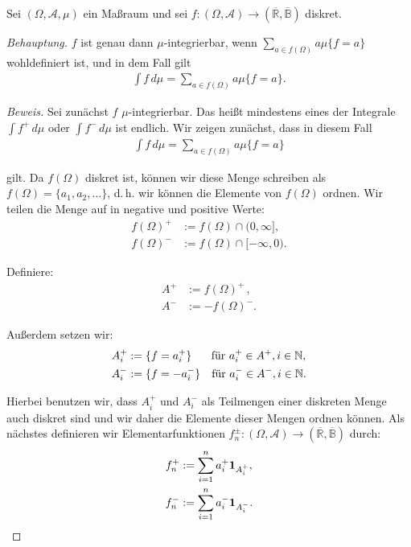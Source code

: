 \documentclass[10pt]{article}
\newcommand{\R}{\mathbb{R}}
\newcommand{\N}{\mathbb{N}}
\newcommand{\beh}{\textit{Behauptung. }}
\newenvironment{Aufgabe}[2][Aufgabe]{\begin{trivlist}
\item[\hskip \labelsep {\bfseries #1}\hskip \labelsep {\bfseries #2.}]}{\end{trivlist}}
\begin{document}
\begin{theorem} %

	\begin{Aufgabe}{2}
		Sei $(\Omega,\mathcal{A},\mu)$ ein Maßraum und sei $f: (\Omega,\mathcal{A})\to (\overline{\R} , \overline{\mathbb{B}})$
		diskret. 
	\end{Aufgabe}

	\beh $f$ ist genau dann $\mu$-integrierbar, wenn $\sum_{a\in f(\Omega)} a\mu\{f=a\}$ 
	wohldefiniert ist, und in dem Fall gilt 
	\begin{align*}
		\int f \,d\mu = \sum_{a\in f(\Omega)} a\mu\{f=a\}.
	\end{align*}
	\begin{proof}[Beweis]
		Sei zunächst $f$ $\mu$-integrierbar. Das heißt mindestens eines der Integrale 
		$\int f^{+} \,d\mu$ oder $\int f^{-} \,d\mu$ ist endlich.
		Wir zeigen zunächst, dass in diesem Fall
		\begin{align*}
			\int f \,d\mu = \sum_{a\in f(\Omega)} a\mu\{f=a\}
		\end{align*}

		gilt. Da $f(\Omega)$ diskret ist, können wir diese Menge schreiben als 
		$f(\Omega) = \{ a_1,a_2,\dots \}$, d.\,h. wir können die Elemente von $f(\Omega)$  
		ordnen. Wir teilen die Menge auf in negative und positive Werte:
		\begin{align*}
			f(\Omega)^{+} &:= f(\Omega)\cap(0,\infty], \\
			f(\Omega)^{-} &:= f(\Omega)\cap[-\infty,0).
		\end{align*}

		Definiere:
		\begin{align*}
			A^{+} &:= f(\Omega)^{+} \,,  \\
			A^{-} &:= -f(\Omega)^{-}.
		\end{align*}

		Außerdem setzen wir:
		\begin{align*}
			A_i^{+} &:= \{ f = a_i^+ \} \quad\text{\hspace{0.15cm} für $a_i^+\in A^+, i\in\N$}, \\
			A_i^{-} &:= \{ f = -a_i^- \} \quad\text{für $a_i^-\in A^-, i\in\N$}.
		\end{align*}

		Hierbei benutzen wir, dass $A_i^{+}$ und $A_i^{-}$ als Teilmengen einer diskreten Menge 
		auch diskret sind und wir daher die Elemente dieser Mengen ordnen können.  
		Als nächstes definieren wir Elementarfunktionen $f_n^\pm : (\Omega,\mathcal{A})\to (\overline{\R} , \overline{\mathbb{B}})$ durch:
		\begin{align*}
			f^{+}_n &:= \sum_{i=1}^{n} a_i^+ \text{\textbf{1}}_{A^{+}_i}, \\															   
			f^{-}_n &:= \sum_{i=1}^{n} a_i^- \text{\textbf{1}}_{A^{-}_i}.								   
		\end{align*}


\end{proof}
\end{theorem}
\end{document}
